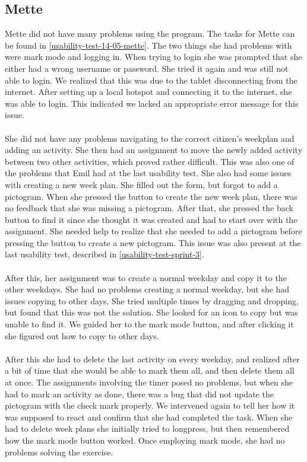 \subsection{Mette}
Mette did not have many problems using the program.
The tasks for Mette can be found in \autoref{usability-test-14-05-mette}.
The two things she had problems with were mark mode and logging in.
When trying to login she was prompted that she either had a wrong username or password. 
She tried it again and was still not able to login.
We realized that this was due to the tablet disconnecting from the internet.
After setting up a local hotspot and connecting it to the internet, she was able to login.
This indicated we lacked an appropriate error message for this issue.
\\\\
She did not have any problems navigating to the correct citizen's weekplan and adding an activity.
She then had an assignment to move the newly added activity between two other activities, which proved rather difficult. 
This was also one of the problems that Emil had at the last usability test.
She also had some issues with creating a new week plan.
She filled out the form, but forgot to add a pictogram. 
When she pressed the button to create the new week plan, there was no feedback that she was missing a pictogram.
After that, she pressed the back button to find it since she thought it was created and had to start over with the assignment. 
She needed help to realize that she needed to add a pictogram before pressing the button to create a new pictogram.
This issue was also present at the last usability test, described in \autoref{usability-test-sprint-3}.
\\\\
After this, her assignment was to create a normal weekday and copy it to the other weekdays.
She had no problems creating a normal weekday, but she had issues copying to other days.
She tried multiple times by dragging and dropping, but found that this was not the solution. She looked for an icon to copy but was unable to find it. 
We guided her to the mark mode button, and after clicking it she figured out how to copy to other days.
\\\\
After this she had to delete the last activity on every weekday, and realized after a bit of time that she would be able to mark them all, and then delete them all at once.
The assignments involving the timer posed no problems, but when she had to mark an activity as done, there was a bug that did not update the pictogram with the check mark properly. 
We intervened again to tell her how it was supposed to react and confirm that she had completed the task.
When she had to delete week plans she initially tried to longpress, but then remembered how the mark mode button worked. 
Once employing mark mode, she had no problems solving the exercise.

